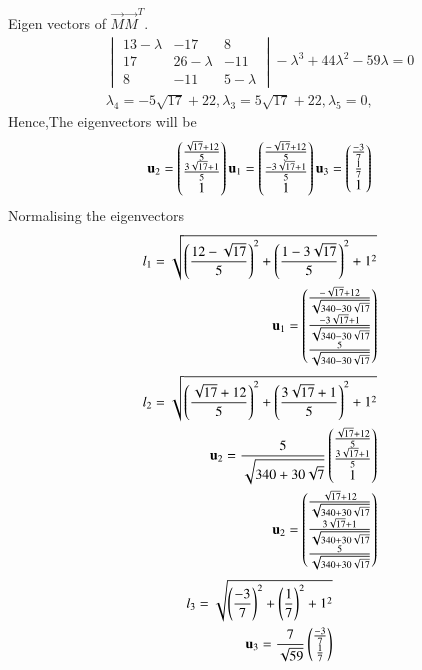 Eigen vectors of $\vec{M}$$\vec{M}^T.$
\begin{align}
\begin{vmatrix}
13-\lambda&-17&8\\17&26-\lambda&-11\\8&-11&5-\lambda
\end{vmatrix}
-\lambda^3+44\lambda^2-59\lambda=0\\
\lambda_4=-5\sqrt{17}+22,\lambda_3=5\sqrt{17}+22,\lambda_5=0,
\end{align}
Hence,The eigenvectors will be
\begin{align}
\mathbf{u}_2=\begin{pmatrix}\frac{\sqrt{17}+12}{5}\\\frac{3\sqrt{17}+1}{5}\\1\end{pmatrix}
\mathbf{u}_1=\begin{pmatrix}\frac{-\sqrt{17}+12}{5}\\\frac{-3\sqrt{17}+1}{5}\\1\end{pmatrix}
\mathbf{u}_3=\begin{pmatrix}\frac{-3}{7}\\\frac{1}{7}\\1\end{pmatrix}
\end{align}
Normalising the eigenvectors
\begin{align}
l_1=\sqrt{{\left(\frac{12-\sqrt{17}}{5}\right)}^2+{\left(\frac{1-3\sqrt{17}}{5}\right)}^2+1^2}\\
\mathbf{u}_1=\begin{pmatrix}\frac{-\sqrt{17}+12}{\sqrt{340-30\sqrt{17}}}\\\frac{-3\sqrt{17}+1}{\sqrt{340-30\sqrt{17}}}\\\frac{5}{\sqrt{340-30\sqrt{17}}}\end{pmatrix}\\
\end{align}
\begin{align}
l_2=\sqrt{\left({\frac{\sqrt{17}+12}{5}}\right)^2+\left({\frac{3\sqrt{17}+1}{5}}\right)^2+1^2}\\
\mathbf{u}_2=\frac{5}{\sqrt{340+30\sqrt{7}}}\begin{pmatrix}\frac{\sqrt{17}+12}{5}\\\frac{3\sqrt{17}+1}{5}\\1\end{pmatrix}\\
\mathbf{u}_2=\begin{pmatrix}\frac{\sqrt{17}+12}{\sqrt{340+30\sqrt{17}}}\\\frac{3\sqrt{17}+1}{\sqrt{340+30\sqrt{17}}}\\\frac{5}{\sqrt{340+30\sqrt{17}}}\end{pmatrix}
\end{align}
\begin{align}
l_3=\sqrt{\left({\frac{-3}{7}}\right)^2+\left({\frac{1}{7}}\right)^2+1^2}\\
\vec{u}_3=\frac{7}{\sqrt{59}}\myvec{\frac{-3}{7}\\\frac{1}{7}}\\

\end{align}$$
